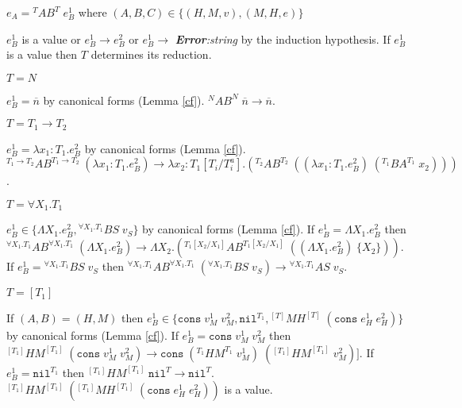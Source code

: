 \begin{case}
\label{ab}
$e_{A}={^{T}A}B^{T}\;e_{B}^{1}$ where $(A,B,C)\in\lbrace(H,M,v),(M,H,e)\rbrace$

$e_{B}^{1}$ is a value or $e_{B}^{1}\rightarrow e_{B}^{2}$ or $e_{B}^{1}\rightarrow$ \emph{\textbf{Error}:\;string} by the induction hypothesis.  If $e_{B}^{1}$ is a value then $T$ determines its reduction.
\begin{subcase}
$T=N$

$e_{B}^{1}=\overline{n}$ by canonical forms (Lemma \ref{cf}).  $^{N}AB^{N}\;\overline{n}\rightarrow\overline{n}$.
\end{subcase}
\begin{subcase}
$T=T_{1}\rightarrow T_{2}$

$e_{B}^{1}=\lambda x_{1}:T_{1}.e_{B}^{2}$ by canonical forms (Lemma \ref{cf}).  $^{T_{1}\rightarrow T_{2}}AB^{T_{1}\rightarrow T_{2}}\;(\lambda x_{1}:T_{1}.e_{B}^{2})\rightarrow\lambda x_{2}:T_{1}[T_{i}/T^{a}_{i}].(^{T_{2}}AB^{T_{2}}\;((\lambda x_{1}:T_{1}.e_{B}^{2})\;(^{T_{1}}BA^{T_{1}}\;x_{2})))$.
\end{subcase}
\begin{subcase}
$T=\forall X_{1}.T_{1}$

$e_{B}^{1}\in\lbrace\Lambda X_{1}.e_{B}^{2},{^{\forall X_{1}.T_{1}}B}S\;v_{S}\rbrace$ by canonical forms (Lemma \ref{cf}).  If $e_{B}^{1}=\Lambda X_{1}.e_{B}^{2}$ then $^{\forall X_{1}.T_{1}}AB^{\forall X_{1}.T_{1}}\;(\Lambda X_{1}.e_{B}^{2})\rightarrow\Lambda X_{2}.(^{T_{1}[X_{2}/X_{1}]}AB^{T_{1}[X_{2}/X_{1}]}\;((\Lambda X_{1}.e_{B}^{2})\;\lbrace X_{2}\rbrace))$.  If $e_{B}^{1}={^{\forall X_{1}.T_{1}}B}S\;v_{S}$ then $^{\forall X_{1}.T_{1}}AB^{\forall X_{1}.T_{1}}\;(^{\forall X_{1}.T_{1}}BS\;v_{S})\rightarrow{^{\forall X_{1}.T_{1}}A}S\;v_{S}$.
\end{subcase}
\begin{subcase}
$T=[T_{1}]$

If $(A,B)=(H,M)$ then $e_{B}^{1}\in\lbrace\mathtt{cons}\;v_{M}^{1}\;v_{M}^{2},\mathtt{nil}^{T_{1}},{^{[T]}M}H^{[T]}\;(\mathtt{cons}\;e_{H}^{1}\;e_{H}^{2})\rbrace$ by canonical forms (Lemma \ref{cf}).  If $e_{B}^{1}=\mathtt{cons}\;v_{M}^{1}\;v_{M}^{2}$ then $^{[T_{1}]}HM^{[T_{1}]}\;(\mathtt{cons}\;v_{M}^{1}\;v_{M}^{2})\rightarrow\mathtt{cons}\;(^{T_{1}}HM^{T_{1}}\;v_{M}^{1})\;(^{[T_{1}]}HM^{[T_{1}]}\;v_{M}^{2})]$.  If $e_{B}^{1}=\mathtt{nil}^{T_{1}}$ then $^{[T_{1}]}HM^{[T_{1}]}\;\mathtt{nil}^{T}\rightarrow\mathtt{nil}^{T}$.  $^{[T_{1}]}HM^{[T_{1}]}\;(^{[T_{1}]}MH^{[T_{1}]}\;(\mathtt{cons}\;e_{H}^{1}\;e_{H}^{2}))$ is a value.


\end{subcase}
\end{case}
